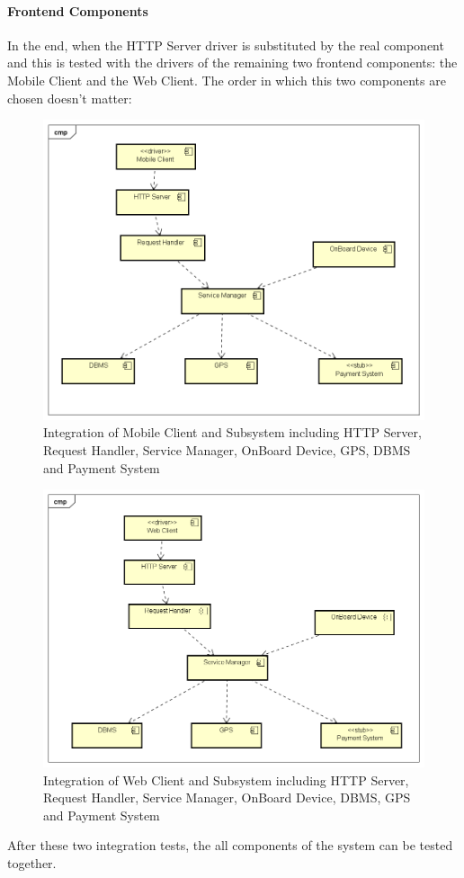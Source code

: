\paragraph{Frontend Components}
In the end, when the HTTP Server driver is substituted by the real component and this is tested with the drivers of the remaining two frontend components: the Mobile Client and the Web Client. The order in which this two components are chosen doesn't matter:
\begin{figure}[H]	
	\centering
	\includegraphics[width=\textwidth]{img/HTTP_MobCli_int}
	\caption{Integration of Mobile Client and Subsystem including HTTP Server, Request Handler, Service Manager, OnBoard Device, GPS, DBMS and Payment System}
\end{figure}

\begin{figure}[H]	
	\centering
	\includegraphics[width=\textwidth]{img/HTTP_WebCli_int}
	\caption{Integration of Web Client and Subsystem including HTTP Server, Request Handler, Service Manager, OnBoard Device, DBMS, GPS and Payment System}
\end{figure}

After these two integration tests, the all components of the system can be tested together.





